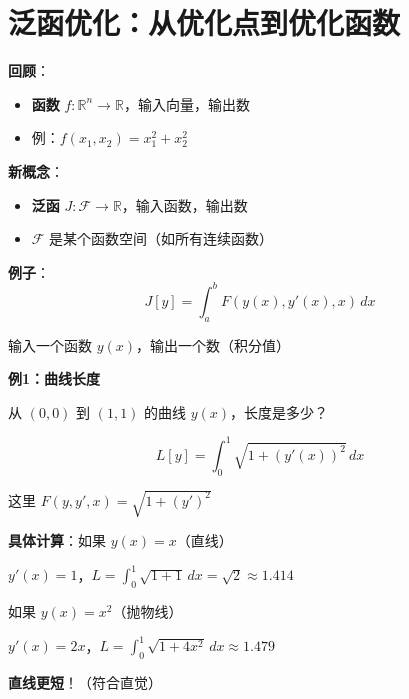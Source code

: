 \documentclass[12pt, a4paper]{ctexart}
\begin{document}
\section{泛函优化：从优化点到优化函数}

\begin{blackboard}[什么是泛函？]

\textbf{回顾}：
\begin{itemize}
    \item \textbf{函数} $f: \mathbb{R}^n \to \mathbb{R}$，输入向量，输出数
    \item 例：$f(x_1, x_2) = x_1^2 + x_2^2$
\end{itemize}

\textbf{新概念}：
\begin{itemize}
    \item \textbf{泛函} $J: \mathcal{F} \to \mathbb{R}$，输入函数，输出数
    \item $\mathcal{F}$ 是某个函数空间（如所有连续函数）
\end{itemize}

\textbf{例子}：
\[
J[y] = \int_a^b F(y(x), y'(x), x) \, dx
\]

输入一个函数 $y(x)$，输出一个数（积分值）

\end{blackboard}

\begin{blackboard}[泛函的具体例子]

\textbf{例1：曲线长度}

从 $(0, 0)$ 到 $(1, 1)$ 的曲线 $y(x)$，长度是多少？

\[
L[y] = \int_0^1 \sqrt{1 + (y'(x))^2} \, dx
\]

这里 $F(y, y', x) = \sqrt{1 + (y')^2}$

\textbf{具体计算}：如果 $y(x) = x$（直线）

$y'(x) = 1$，$L = \int_0^1 \sqrt{1 + 1} \, dx = \sqrt{2} \approx 1.414$

如果 $y(x) = x^2$（抛物线）

$y'(x) = 2x$，$L = \int_0^1 \sqrt{1 + 4x^2} \, dx \approx 1.479$

\textbf{直线更短}！（符合直觉）

\end{blackboard}
\end{document}
